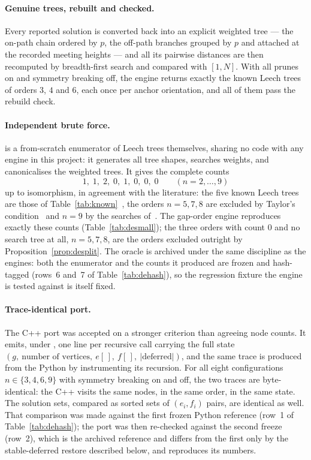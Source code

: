 \paragraph{Genuine trees, rebuilt and checked.}
Every reported solution is converted back into an explicit weighted tree --- the
on-path chain ordered by $p$, the off-path branches grouped by $p$ and attached
at the recorded meeting heights --- and all its pairwise distances are then
recomputed by breadth-first search and compared with $[1,N]$.  With all prunes
on and symmetry breaking off, the engine returns exactly the known Leech trees
of orders $3$, $4$ and $6$, each once per anchor orientation, and all of them
pass the rebuild check.

\paragraph{Independent brute force.}
 is a from-scratch enumerator of Leech trees
themselves, sharing no code with any engine in this project: it generates all
tree shapes, searches weights, and canonicalises the weighted trees.  It gives
the complete counts
\[
  1,\;1,\;2,\;0,\;1,\;0,\;0,\;0\qquad(n=2,\dots,9)
\]
up to isomorphism, in agreement with the literature: the five known Leech trees
are those of Table~\ref{tab:known}~\cite{Leech1975}, the orders $n=5,7,8$ are
excluded by Taylor's condition~\cite{Taylor1977} and $n=9$ by the searches
of~\cite{SzekelyWangZhang2005,Calhoun2007}.  The
gap-order engine reproduces exactly these counts
(Table~\ref{tab:desmall}); the three orders with count $0$ and no search tree at
all, $n=5,7,8$, are the orders excluded outright by
Proposition~\ref{prop:desplit}.  The oracle is archived under the same
discipline as the engines: both the enumerator and the counts it produced are
frozen and hash-tagged (rows~6 and~7 of Table~\ref{tab:dehash}), so the
regression fixture the engine is tested against is itself fixed.

\paragraph{Trace-identical port.}
The C++ port was accepted on a stronger criterion than agreeing node counts.  It
emits, under , one line per recursive call carrying the full state
$(g,\ \text{number of vertices},\ e[\,],\ f[\,],\ |\text{deferred}|)$, and the
same trace is produced from the Python by instrumenting its recursion.  For all
eight configurations $n\in\{3,4,6,9\}$ with symmetry breaking on and off, the
two traces are byte-identical: the C++ visits the same nodes, in the same order,
in the same state.  The solution sets, compared as sorted sets of $(e_i,f_i)$
pairs, are identical as well.  That comparison was made against the first frozen
Python reference (row~1 of Table~\ref{tab:dehash}); the port was then re-checked
against the second freeze (row~2), which is the archived reference and differs
from the first only by the stable-deferred restore described below, and
reproduces its numbers.

